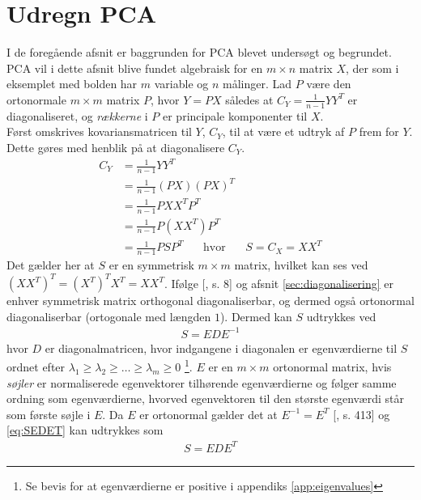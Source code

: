 \section{Udregn PCA} \label{sec:UdregnPCA}
I de foregående afsnit er baggrunden for PCA blevet undersøgt og begrundet. PCA vil i dette afsnit blive fundet algebraisk for en $m\times n$ matrix $X$, der som i eksemplet med bolden har $m$ variable og $n$ målinger. Lad $P$ være den ortonormale $m \times m$ matrix $P$, hvor $Y=PX$ således at $C_Y=\frac{1}{n-1}YY^T$ er diagonaliseret, og \emph{rækkerne} i $P$ er principale komponenter til $X$. \\
Først omskrives kovariansmatricen til $Y$, $C_Y$, til at være et udtryk af $P$ frem for $Y$. Dette gøres med henblik på at diagonalisere $C_Y$.
\begin{align}
C_Y 	& = \frac{1}{n-1} YY^T						\\
	& = \frac{1}{n-1} (PX)(PX)^T		\nonumber	\\
	& = \frac{1}{n-1} PXX^TP^T		\nonumber	\\
	& = \frac{1}{n-1} P(XX^T)P^T		\nonumber	\\
	& = \frac{1}{n-1} PSP^T \label{eq:CY omskrivning} \phantom{mm} \text{hvor}\phantom{mm} S = C_X = XX^T
\end{align}
Det gælder her at $S$ er en symmetrisk $m \times m$ matrix, hvilket kan ses ved $(XX^T)^T = (X^T)^TX^T = XX^T$. Ifølge [\citet{PCA_people}, s. 8] og afsnit \ref{sec:diagonalisering} er enhver symmetrisk matrix orthogonal diagonaliserbar, og dermed også ortonormal diagonaliserbar (ortogonale med længden $1$). Dermed kan $S$ udtrykkes ved 
\begin{align*}
S=EDE^{-1}
\end{align*}
hvor $D$ er diagonalmatricen, hvor indgangene i diagonalen er egenværdierne til $S$ ordnet efter $\lambda_1 \geq \lambda_2 \geq \ldots \geq \lambda_m \geq 0$ \footnote{Se bevis for at egenværdierne er positive i appendiks \ref{app:eigenvalues}}. $E$ er en $m \times m$ ortonormal matrix, hvis \emph{søjler} er normaliserede egenvektorer tilhørende egenværdierne og følger samme ordning som egenværdierne, hvorved egenvektoren til den største egenværdi står som første søjle i $E$. 
Da $E$ er ortonormal gælder det at $E^{-1}=E^T$ [\cite{linalg}, s. 413] og \ref{eq:SEDET} kan udtrykkes som
\begin{align}
S=EDE^T
\label{eq:SEDET}
\end{align}

